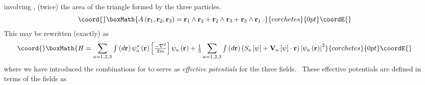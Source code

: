 \documentclass[a4paper,12pt]{article}%
\begin{document}
involving \coordHE{}, (twice) the area of the triangle formed by the three particles.%
\[\coord{}\boxMath{
A\left(  \mathbf{r}_{1},\mathbf{r}_{2},\mathbf{r}_{3}\right)  =\mathbf{r}%
_{1}\wedge\mathbf{r}_{2}+\mathbf{r}_{2}\wedge\mathbf{r}_{3}+\mathbf{r}%
_{3}\wedge\mathbf{r}_{1}\;.
}{corchetes}{0pt}\coordE{}\]
This may be rewritten (exactly) as%
\[\coord{}\boxMath{
H=\sum_{a=1,2,3}%
{\textstyle\int}
\left(  d\mathbf{r}\right)  \psi_{a}^{\ast}\left(  \mathbf{r}\right)  \left[
\tfrac{-\nabla^{2}}{2m}\right]  \psi_{a}\left(  \mathbf{r}\right)  +\tfrac
{1}{3}\sum_{a=1,2,3}%
{\textstyle\int}
\left(  d\mathbf{r}\right)  \left(  S_{a}\left[  \psi\right]  +\mathbf{V}%
_{a}\left[  \psi\right]  \cdot\mathbf{r}\right)  \left|  \psi_{a}\left(
\mathbf{r}\right)  \right|  ^{2}%
}{corchetes}{0pt}\coordE{}\]
where we have introduced the combinations \coordHE{} for \coordHE{} to serve as
\emph{effective potentials} for the three fields. \ These effective potentials
are defined in terms of the fields as%
\end{document}
